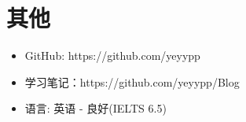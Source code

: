 \documentclass{resume}
\begin{document}
\section{其他}
\begin{itemize}[parsep=0.5ex]
  \item GitHub: https://github.com/yeyypp
  \item 学习笔记：https://github.com/yeyypp/Blog
  \item 语言: 英语 - 良好(IELTS 6.5)
\end{itemize}

%
%
\end{document}

